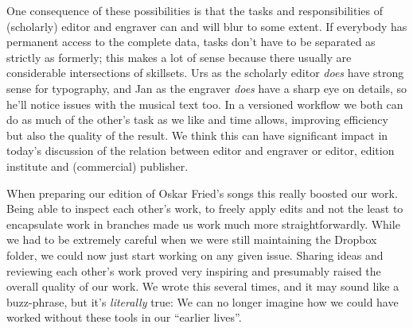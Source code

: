 \documentclass[11pt,a4paper]{article}
\begin{document}
One consequence of these possibilities is that the tasks and responsibilities of
(scholarly) editor and engraver can and will blur to some extent. If everybody has
permanent access to the complete data, tasks don't have to be separated as
strictly as formerly; this makes a lot of sense because there usually are considerable
intersections of skillsets. Urs as the scholarly editor \emph{does} have strong sense
for typography, and Jan as the engraver \emph{does} have a sharp eye on details, so
he'll notice issues with the musical text too. In a versioned workflow we both can do
as much of the other's task as we like and time allows, improving efficiency but also
the quality of the result. We think this can have significant impact in today's
discussion of the relation between editor and engraver or editor, edition institute and
(commercial) publisher.

When preparing our edition of Oskar Fried's songs this really boosted our work. Being
able to inspect each other's work, to freely apply edits and not the least to encapsulate
work in branches made us work much more straightforwardly. While we had to be
extremely careful when we were still maintaining the Dropbox folder, we could now just
start working on any given issue. Sharing ideas and reviewing each other's work proved
very inspiring and presumably raised the overall quality of our work. We wrote this
several times, and it may sound like a buzz-phrase, but it's \emph{literally} true:
We can no longer imagine how we could have worked without these tools in our “earlier lives”.
\end{document}
